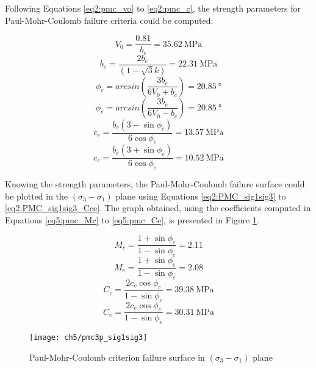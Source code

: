 Following Equations \ref{eq2:pmc_vo} to \ref{eq2:pmc_c}, the strength parameters for Paul-Mohr-Coulomb failure criteria could be computed:

\begin{equation}
    V_0 = \frac{0.81}{b_c} = \SI{35.62}{\mega\pascal}
\end{equation}
\begin{equation}\label{eq5:pmc_be}
    b_e = \frac{2b_c}{(1-\sqrt{3}k)} = \SI{22.31}{\mega\pascal}
\end{equation}
\begin{equation}
    \phi_c = arcsin\left(\frac{3b_c}{6V_0+b_c}\right) = \SI{20.85}{\degree}
\end{equation}
\begin{equation}
    \phi_e = arcsin\left(\frac{3b_e}{6V_0-b_c}\right) = \SI{20.85}{\degree}
\end{equation}
\begin{equation}
    c_{c}=\frac{b_{c}\left(3-\sin \phi_{c}\right)}{6 \cos \phi_{c}} = \SI{13.57}{\mega\pascal}
\end{equation}
\begin{equation}
    c_{e}=\frac{b_{e}\left(3+\sin \phi_{e}\right)}{6 \cos \phi_{e}} = \SI{10.52}{\mega\pascal}
\end{equation}

Knowing the strength parameters, the Paul-Mohr-Coulomb failure surface could be plotted in the $(\sigma_3-\sigma_1)$ plane using Equations \ref{eq2:PMC_sig1sig3} to \ref{eq2:PMC_sig1sig3_Cce}. The graph obtained, using the coefficients computed in Equations \ref{eq5:pmc_Mc} to \ref{eq5:pmc_Ce}, is presented in Figure \ref{fig5:pmc_sig1sig3}.

\begin{equation}\label{eq5:pmc_Mc}
    M_c = \frac{1+\sin \phi_c}{1-\sin \phi_c} = 2.11
\end{equation}
\begin{equation}
    M_e = \frac{1+\sin \phi_e}{1-\sin \phi_e} = 2.08
\end{equation}
\begin{equation}
    C_c = \frac{2c_c\cos \phi_c}{1-\sin \phi_c} = \SI{39.38}{\mega\pascal}
\end{equation}
\begin{equation}\label{eq5:pmc_Ce}
    C_e = \frac{2c_e\cos \phi_e}{1-\sin \phi_e} = \SI{30.31}{\mega\pascal}
\end{equation}

\begin{figure}[p]
    \centering
    \texttt{[image: ch5/pmc3p\_sig1sig3]}
    \caption{Paul-Mohr-Coulomb criterion failure surface in  $(\sigma_3-\sigma_1)$ plane}
    \label{fig5:pmc_sig1sig3}
\end{figure}

